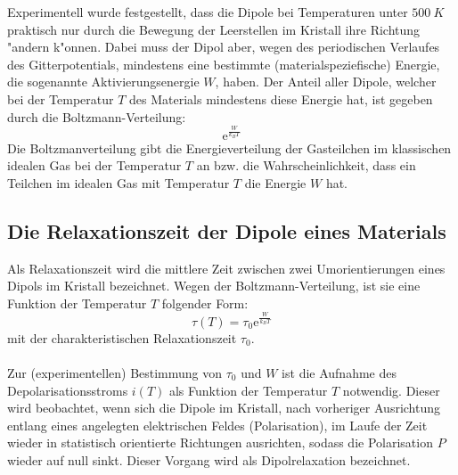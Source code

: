     Experimentell wurde festgestellt, dass die Dipole bei Temperaturen unter $\SI{500}{K}$ praktisch nur durch die Bewegung der Leerstellen im Kristall ihre Richtung "andern k"onnen.
    Dabei muss der Dipol aber, wegen des periodischen Verlaufes des Gitterpotentials, mindestens eine bestimmte (materialspeziefische) Energie, die sogenannte Aktivierungsenergie $W$, haben.
    Der Anteil aller Dipole, welcher bei der Temperatur $T$ des Materials mindestens diese Energie hat, ist gegeben durch die Boltzmann-Verteilung:
    \begin{equation}
      \text{e}^{\frac{W}{k_BT}}
      \label{relaxationszeit}
    \end{equation}
    Die Boltzmanverteilung gibt die Energieverteilung der Gasteilchen im klassischen idealen Gas bei der Temperatur $T$ an bzw. die Wahrscheinlichkeit, dass ein Teilchen im idealen Gas mit Temperatur $T$ die Energie $W$ hat.




  \subsection{Die Relaxationszeit der Dipole eines Materials}
    Als Relaxationszeit wird die mittlere Zeit zwischen zwei Umorientierungen eines Dipols im Kristall bezeichnet.
    Wegen der Boltzmann-Verteilung, ist sie eine Funktion der Temperatur $T$ folgender Form:
    \begin{equation}
      \tau(T) = \tau_0 \text{e}^{\frac{W}{k_BT}}
      \label{relaxzeit}
    \end{equation}
    mit der charakteristischen Relaxationszeit $\tau_0$.\\
    \\Zur (experimentellen) Bestimmung von $\tau_0$ und $W$ ist die Aufnahme des Depolarisationsstroms $i(T)$ als Funktion der Temperatur $T$ notwendig.
    Dieser wird beobachtet, wenn sich die Dipole im Kristall, nach vorheriger Ausrichtung entlang eines angelegten elektrischen Feldes (Polarisation), im Laufe der Zeit wieder in statistisch orientierte Richtungen ausrichten, sodass die Polarisation $P$ wieder auf null sinkt.
    Dieser Vorgang wird als Dipolrelaxation bezeichnet.

